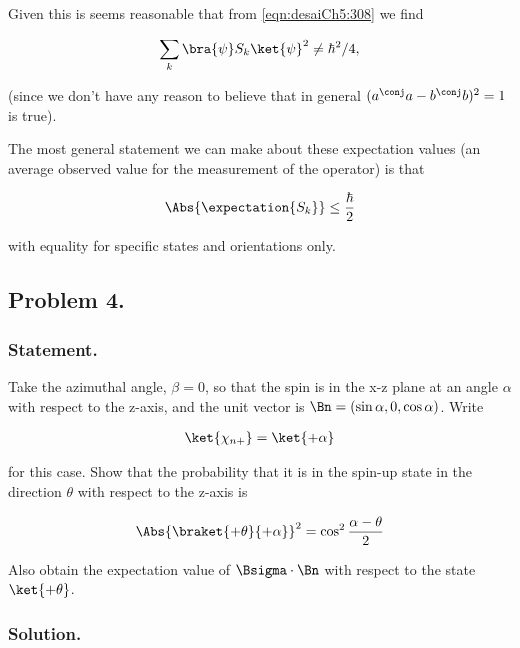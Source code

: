 Given this is seems reasonable that from \ref{eqn:desaiCh5:308} we find

\begin{align}\label{eqn:desaiCh5:311}
\sum_k {\bra{\psi} S_k \ket{\psi}}^2 \ne \hbar^2/4,
\end{align}

(since we don't have any reason to believe that in general $( a^\conj a - b^\conj b )^2 = 1$ is true).

The most general statement we can make about these expectation values (an average observed value for the measurement of the operator) is that

\begin{align}\label{eqn:desaiCh5:312}
\Abs{\expectation{S_k}} \le \frac{\hbar}{2} 
\end{align}

with equality for specific states and orientations only.

\subsection{Problem 4.}
\subsubsection{Statement.}

Take the azimuthal angle, $\beta = 0$, so that the spin is in the 
x-z plane at an angle $\alpha$ with respect to the z-axis, and the unit vector is $\Bn = (\sin\alpha, 0, \cos\alpha)$.  Write

\begin{align}\label{eqn:boostCommutator:500}
\ket{\chi_{n+}} = \ket{+\alpha}
\end{align}

for this case.  Show that the probability that it is in the spin-up state in the direction $\theta$ with respect to the z-axis is

\begin{align}\label{eqn:boostCommutator:501}
\Abs{ \braket{+\theta}{+\alpha} }^2 = \cos^2 \frac{\alpha - \theta}{2}
\end{align}

Also obtain the expectation value of $\Bsigma \cdot \Bn$ with respect to the state $\ket{+\theta}$.

\subsubsection{Solution.}

